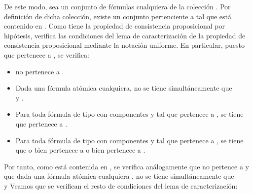 \begin{isabellebody}
\begin{isamarkuptext}
\begin{demostracion}
  De este modo, sea  un conjunto de fórmulas cualquiera de la colección . Por definición de
  dicha colección, existe un conjunto  pertenciente a  tal que  está contenido en .
  Como  tiene la propiedad de consistencia proposicional por hipótesis, verifica las condiciones
  del lema de caracterización de la propiedad de consistencia proposicional mediante la notación 
  uniforme. En particular, puesto que  pertenece a , se verifica: 
  \begin{itemize}
    \item \isa{{\isasymbottom}} no pertenece a .
    \item Dada  una fórmula atómica cualquiera, no se tiene 
    simultáneamente que\\  y .
    \item Para toda fórmula de tipo \isa{{\isasymalpha}} con componentes  y  tal que \isa{{\isasymalpha}}
    pertenece a , se tiene que  pertenece a .
    \item Para toda fórmula de tipo \isa{{\isasymbeta}} con componentes  y  tal que \isa{{\isasymbeta}}
    pertenece a , se tiene que o bien  pertenece a  o 
    bien  pertenece a .
  \end{itemize} 

  Por tanto, como  está contenida en , se verifica análogamente que \isa{{\isasymbottom}} no pertence a 
  y que dada una fórmula atómica cualquiera , no se tiene simultáneamente que\\  y 
   Veamos que se verifican el resto de condiciones del lema de caracterización:


\end{demostracion}
\end{isamarkuptext}
\end{isabellebody}
